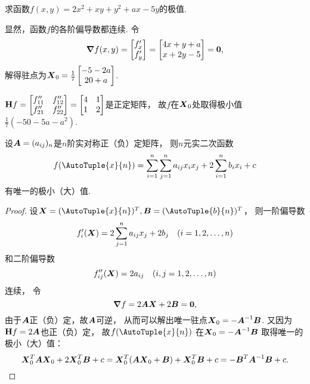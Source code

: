 \begin{example}
求函数\(f(x,y) = 2x^2 + xy + y^2 + ax - 5y\)的极值.
\begin{solution}
显然，函数\(f\)的各阶偏导数都连续.
令\[
	\grad f(x,y) = \begin{bmatrix} f'_x \\ f'_y \end{bmatrix}
	= \begin{bmatrix} 4x+y+a \\ x+2y-5 \end{bmatrix} = \boldsymbol{0},
\]
解得驻点为\(\boldsymbol{X}_{0} = \frac{1}{7} \begin{bmatrix} -5-2a \\ 20+a \end{bmatrix}\).

\(\boldsymbol{\operatorname{H}} f = \begin{bmatrix}
	f''_{11} & f''_{12} \\
	f''_{21} & f''_{22}
\end{bmatrix}
= \begin{bmatrix}
4 & 1 \\
1 & 2
\end{bmatrix}\)是正定矩阵，
故\(f\)在\(\boldsymbol{X}_{0}\)处取得极小值\(\frac{1}{7} (-50-5a-a^2)\).
\end{solution}
\end{example}

\begin{proposition}
设\(\boldsymbol{A} = (a_{ij})_n\)是\(n\)阶实对称正（负）定矩阵，
则\(n\)元实二次函数\[
	f(\AutoTuple{x}{n})
	= \sum_{i=1}^n \sum_{j=1}^n a_{ij} x_i x_j
	+ 2 \sum_{i=1}^n b_i x_i + c
\]有唯一的极小（大）值.
\begin{proof}
设\(\vb{X} = (\AutoTuple{x}{n})^T,
\vb{B} = (\AutoTuple{b}{n})^T\)，
则一阶偏导数\[
	f'_i(\boldsymbol{X})
	= 2 \sum_{j=1}^n a_{ij} x_j + 2 b_j
	\quad(i=1,2,\dotsc,n)
\]和二阶偏导数\[
	f''_{ij}(\boldsymbol{X})
	= 2 a_{ij}
	\quad(i,j=1,2,\dotsc,n)
\]连续，
令\[
	\grad f
	= 2 \boldsymbol{A} \boldsymbol{X} + 2 \boldsymbol{B}
	= \boldsymbol0,
\]
由于\(\boldsymbol{A}\)正（负）定，故\(\boldsymbol{A}\)可逆，
从而可以解出唯一驻点\(\boldsymbol{X}_0 = -\boldsymbol{A}^{-1} \boldsymbol{B}\).
又因为\(\boldsymbol{\operatorname{H}} f
= 2 \boldsymbol{A}\)也正（负）定，
故\(f(\AutoTuple{x}{n})\)
在\(\boldsymbol{X}_0 = -\boldsymbol{A}^{-1} \boldsymbol{B}\)
取得唯一的极小（大）值：\[
	\boldsymbol{X}_0^T \boldsymbol{A} \boldsymbol{X}_0
	+ 2 \boldsymbol{X}_0^T \boldsymbol{B} + c
	= \boldsymbol{X}_0^T (\boldsymbol{A} \boldsymbol{X}_0 + \boldsymbol{B})
	+ \boldsymbol{X}_0^T \boldsymbol{B} + c
	= -\boldsymbol{B}^T \boldsymbol{A}^{-1} \boldsymbol{B} + c.
\]
\end{proof}
\end{proposition}

